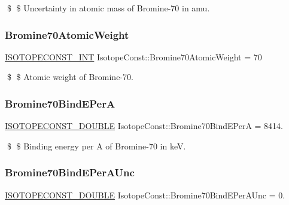 \$ \$ Uncertainty in atomic mass of Bromine-\/70 in amu. \mbox{\label{group___isotope_const-_bromine-_br70_ga7647ea2b1214fe431b094ad1edc6882c}} 
\subsubsection{\texorpdfstring{Bromine70\+Atomic\+Weight}{Bromine70AtomicWeight}}
{\footnotesize\ttfamily \mbox{\hyperlink{group___isotope_const-_macros_ga5f18360b3e99483a35c32d789e62621c}{I\+S\+O\+T\+O\+P\+E\+C\+O\+N\+S\+T\+\_\+\+I\+NT}} Isotope\+Const\+::\+Bromine70\+Atomic\+Weight = 70}

\$ \$ Atomic weight of Bromine-\/70. \mbox{\label{group___isotope_const-_bromine-_br70_ga757abc790a646a604c720f5616333826}} 
\subsubsection{\texorpdfstring{Bromine70\+Bind\+E\+PerA}{Bromine70BindEPerA}}
{\footnotesize\ttfamily \mbox{\hyperlink{group___isotope_const-_macros_ga8f45a7272ce02c0b4c65c44636ed719a}{I\+S\+O\+T\+O\+P\+E\+C\+O\+N\+S\+T\+\_\+\+D\+O\+U\+B\+LE}} Isotope\+Const\+::\+Bromine70\+Bind\+E\+PerA = 8414.}

\$ \$ Binding energy per A of Bromine-\/70 in keV. \mbox{\label{group___isotope_const-_bromine-_br70_gaa813718574a1af64b6f8ad074b527173}} 
\subsubsection{\texorpdfstring{Bromine70\+Bind\+E\+Per\+A\+Unc}{Bromine70BindEPerAUnc}}
{\footnotesize\ttfamily \mbox{\hyperlink{group___isotope_const-_macros_ga8f45a7272ce02c0b4c65c44636ed719a}{I\+S\+O\+T\+O\+P\+E\+C\+O\+N\+S\+T\+\_\+\+D\+O\+U\+B\+LE}} Isotope\+Const\+::\+Bromine70\+Bind\+E\+Per\+A\+Unc = 0.}

